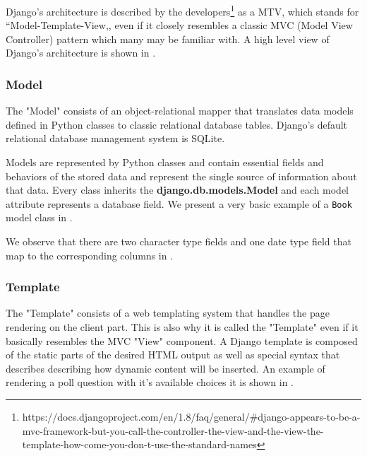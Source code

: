 Django's architecture is described by the developers\footnote{https://docs.djangoproject.com/en/1.8/faq/general/\#django-appears-to-be-a-mvc-framework-but-you-call-the-controller-the-view-and-the-view-the-template-how-come-you-don-t-use-the-standard-names\label{note1}} as a MTV, which stands for ``Model-Template-View,, even if it closely resembles a classic MVC (Model View Controller) pattern which many may be familiar with. A high level view of Django's architecture is shown in .


\subsubsection{Model}
\label{sub-sub-sec:model}

The "Model" consists of an object-relational mapper that translates data models defined in Python classes to classic relational database tables. Django's default relational database management system is SQLite.

Models are represented by Python classes and contain essential fields and behaviors of the stored data and represent the single source of information about that data. Every class inherits the \textbf{django.db.models.Model} and each model attribute represents a database field. We present a  very basic example of a \texttt{Book} model class in .



We observe that there are two character type fields and one date type field that map to the corresponding columns in .



\subsubsection{Template}
\label{sub-sub-sec:template}

The "Template" consists of a web templating system that handles the page rendering on the client part. This is also why it is called the "Template" even if it basically resembles the MVC "View" component. A Django template is composed of the static parts of the desired HTML output as well as special syntax that describes describing how dynamic content will be inserted. An example of rendering a poll question with it's available choices it is shown in .

